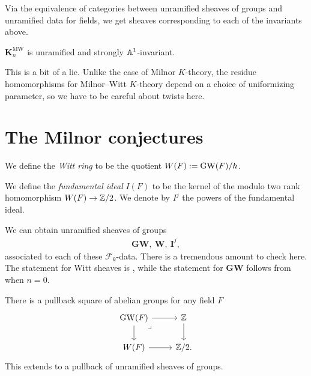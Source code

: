 \documentclass[11pt,openany]{book}
\providecommand{\KMW}{\mathbf{K}^\mathrm{MW}}
\begin{document}
Via the equivalence of categories between unramified sheaves of groups and unramified data for fields, we get sheaves corresponding to each of the invariants above.

\begin{proposition}
\label{prop:KMW-unramified-and-invariant} 
$\KMW_n$ is unramified and strongly $\mathbb{A}^1$-invariant.
\end{proposition}

\begin{warning} This is a bit of a lie. Unlike the case of Milnor $K$-theory, the residue homomorphisms for Milnor--Witt $K$-theory depend on a choice of uniformizing parameter, so we have to be careful about twists here.
\end{warning}


\section{The Milnor conjectures}\label{sec:milnor-conjectures}

\begin{definition} We define the \textit{Witt ring} to be the quotient $W(F) := \mathrm{GW}(F)/h$.
\end{definition}

\begin{definition} We define the \textit{fundamental ideal} $I(F)$ to be the kernel of the modulo two rank homomorphism $W(F) \to \mathbb{Z}/2$. We denote by $I^j$ the powers of the fundamental ideal.
\end{definition}

We can obtain unramified sheaves of groups
\begin{align*}
    \mathbf{GW},\ \mathbf{W},\ \mathbf{I}^j,
\end{align*}
associated to each of these $\mathcal{F}_k$-data. There is a tremendous amount to check here. The statement for Witt sheaves is \cite[Corollary~6]{Morel-connectivity}, while the statement for $\mathbf{GW}$ follows from  when $n=0$.



\begin{proposition}\label{prop:GW-pullback} 
There is a pullback square of abelian groups for any field $F$
\[ \begin{tikzcd}
    \GW(F)\rar\dar\pb & \Z\dar\\
    W(F)\rar & \Z/2.
\end{tikzcd} \]
This extends to a pullback of unramified sheaves of groups.
\end{proposition}
\end{document}
